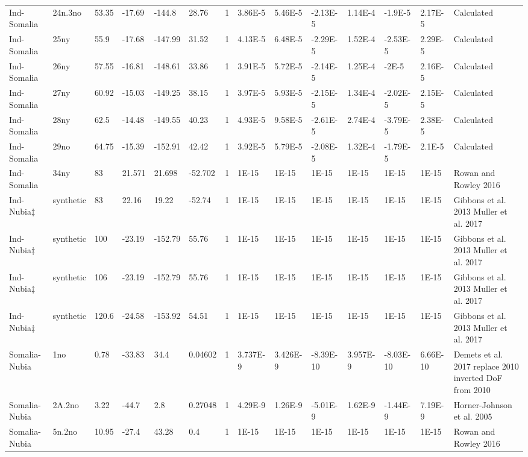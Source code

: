 \begin{landscape}
\begin{longtable}{@{}lllllllllllllp{3.5cm}@{}}
Ind-Somalia & 24n.3no & 53.35 & -17.69 & -144.8 & 28.76 & 1 & 3.86E-5 & 5.46E-5 & -2.13E-5 & 1.14E-4 & -1.9E-5 & 2.17E-5 & Calculated \\
Ind-Somalia & 25ny & 55.9 & -17.68 & -147.99 & 31.52 & 1 & 4.13E-5 & 6.48E-5 & -2.29E-5 & 1.52E-4 & -2.53E-5 & 2.29E-5 & Calculated \\
Ind-Somalia & 26ny & 57.55 & -16.81 & -148.61 & 33.86 & 1 & 3.91E-5 & 5.72E-5 & -2.14E-5 & 1.25E-4 & -2E-5 & 2.16E-5 & Calculated \\
Ind-Somalia & 27ny & 60.92 & -15.03 & -149.25 & 38.15 & 1 & 3.97E-5 & 5.93E-5 & -2.15E-5 & 1.34E-4 & -2.02E-5 & 2.15E-5 & Calculated \\
Ind-Somalia & 28ny & 62.5 & -14.48 & -149.55 & 40.23 & 1 & 4.93E-5 & 9.58E-5 & -2.61E-5 & 2.74E-4 & -3.79E-5 & 2.38E-5 & Calculated \\
Ind-Somalia & 29no & 64.75 & -15.39 & -152.91 & 42.42 & 1 & 3.92E-5 & 5.79E-5 & -2.08E-5 & 1.32E-4 & -1.79E-5 & 2.1E-5 & Calculated \\
Ind-Somalia & 34ny & 83 & 21.571 & 21.698 & -52.702 & 1 & 1E-15 & 1E-15 & 1E-15 & 1E-15 & 1E-15 & 1E-15 & Rowan and Rowley 2016 \\
Ind-Nubia$\ddagger$ & synthetic & 83 & 22.16 & 19.22 & -52.74 & 1 & 1E-15 & 1E-15 & 1E-15 & 1E-15 & 1E-15 & 1E-15 & Gibbons et al. 2013 Muller et al. 2017 \\
Ind-Nubia$\ddagger$ & synthetic & 100 & -23.19 & -152.79 & 55.76 & 1 & 1E-15 & 1E-15 & 1E-15 & 1E-15 & 1E-15 & 1E-15 & Gibbons et al. 2013 Muller et al. 2017 \\
Ind-Nubia$\ddagger$ & synthetic & 106 & -23.19 & -152.79 & 55.76 & 1 & 1E-15 & 1E-15 & 1E-15 & 1E-15 & 1E-15 & 1E-15 & Gibbons et al. 2013 Muller et al. 2017 \\
Ind-Nubia$\ddagger$ & synthetic & 120.6 & -24.58 & -153.92 & 54.51 & 1 & 1E-15 & 1E-15 & 1E-15 & 1E-15 & 1E-15 & 1E-15 & Gibbons et al. 2013 Muller et al. 2017 \\
Somalia-Nubia & 1no & 0.78 & -33.83 & 34.4 & 0.04602 & 1 & 3.737E-9 & 3.426E-9 & -8.39E-10 & 3.957E-9 & -8.03E-10 & 6.66E-10 & Demets et al. 2017 replace 2010 inverted DoF from 2010 \\
Somalia-Nubia & 2A.2no & 3.22 & -44.7 & 2.8 & 0.27048 & 1 & 4.29E-9 & 1.26E-9 & -5.01E-9 & 1.62E-9 & -1.44E-9 & 7.19E-9 & Horner-Johnson et al. 2005 \\
Somalia-Nubia & 5n.2no & 10.95 & -27.4 & 43.28 & 0.4 & 1 & 1E-15 & 1E-15 & 1E-15 & 1E-15 & 1E-15 & 1E-15 & Rowan and Rowley 2016 \\

\end{longtable}
\end{landscape}
